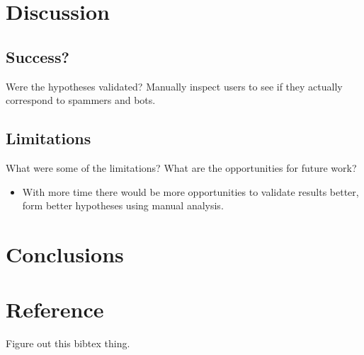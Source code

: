 \documentclass{article}
\begin{document}
\section{Discussion}
\subsection{Success?}
Were the hypotheses validated? Manually inspect users to see if they actually correspond to spammers and bots.
\subsection{Limitations}
What were some of the limitations? What are the opportunities for future work?
\begin{itemize}
\item With more time there would be more opportunities to validate results better, form better hypotheses using manual analysis.
\end{itemize}
\section{Conclusions}
\section{Reference}
Figure out this bibtex thing.
\end{document}
